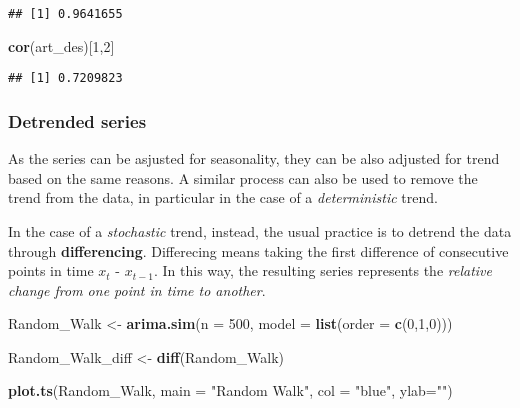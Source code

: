 \documentclass[
]{article}
\newenvironment{Shaded}{\begin{snugshade}}{\end{snugshade}}
\newcommand{\AttributeTok}[1]{\textcolor[rgb]{0.13,0.29,0.53}{#1}}
\newcommand{\DecValTok}[1]{\textcolor[rgb]{0.00,0.00,0.81}{#1}}
\newcommand{\FunctionTok}[1]{\textcolor[rgb]{0.13,0.29,0.53}{\textbf{#1}}}
\newcommand{\NormalTok}[1]{#1}
\newcommand{\OtherTok}[1]{\textcolor[rgb]{0.56,0.35,0.01}{#1}}
\newcommand{\StringTok}[1]{\textcolor[rgb]{0.31,0.60,0.02}{#1}}
\begin{document}
\begin{verbatim}
## [1] 0.9641655
\end{verbatim}

\begin{Shaded}
\begin{Highlighting}[]
\FunctionTok{cor}\NormalTok{(art\_des)[}\DecValTok{1}\NormalTok{,}\DecValTok{2}\NormalTok{]}
\end{Highlighting}
\end{Shaded}

\begin{verbatim}
## [1] 0.7209823
\end{verbatim}

\subsubsection{Detrended series}\label{detrended-series}

As the series can be asjusted for seasonality, they can be also adjusted for trend based on the same reasons. A similar process can also be used to remove the trend from the data, in particular in the case of a \emph{deterministic} trend.

In the case of a \emph{stochastic} trend, instead, the usual practice is to detrend the data through \textbf{differencing}. Differecing means taking the first difference of consecutive points in time \(x_t\) - \(x_{t-1}\). In this way, the resulting series represents the \emph{relative change from one point in time to another}.

\begin{Shaded}
\begin{Highlighting}[]
\NormalTok{Random\_Walk }\OtherTok{\textless{}{-}} \FunctionTok{arima.sim}\NormalTok{(}\AttributeTok{n =} \DecValTok{500}\NormalTok{, }\AttributeTok{model =} \FunctionTok{list}\NormalTok{(}\AttributeTok{order =} \FunctionTok{c}\NormalTok{(}\DecValTok{0}\NormalTok{,}\DecValTok{1}\NormalTok{,}\DecValTok{0}\NormalTok{)))}

\NormalTok{Random\_Walk\_diff }\OtherTok{\textless{}{-}} \FunctionTok{diff}\NormalTok{(Random\_Walk)}

\FunctionTok{plot.ts}\NormalTok{(Random\_Walk,}
        \AttributeTok{main =} \StringTok{"Random Walk"}\NormalTok{, }
        \AttributeTok{col =} \StringTok{"blue"}\NormalTok{, }\AttributeTok{ylab=}\StringTok{""}\NormalTok{)}
\end{Highlighting}
\end{Shaded}
\end{document}
